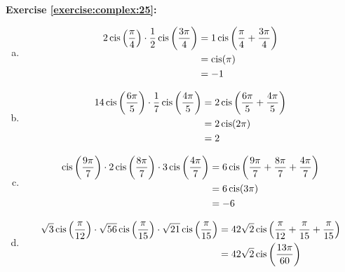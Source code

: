 \noindent\textbf{Exercise \ref{exercise:complex:25}:} %
\begin{enumerate}[(a)]
\item
\begin{align*}
2\operatorname{cis}\left(\frac{\pi}{4}\right) \cdot \frac{1}{2} \operatorname{cis}\left( \frac{3\pi}{4}\right) &= 1\operatorname{cis}\left(\frac{\pi}{4} + \frac{3\pi}{4}\right)\\
&= \operatorname{cis}(\pi)\\
&= -1
\end{align*}

\item 
\begin{align*}
14\operatorname{cis}\left( \frac{6\pi}{5}\right) \cdot \frac{1}{7} \operatorname{cis}\left( \frac{4\pi}{5} \right)  &= 2\operatorname{cis}\left(\frac{6\pi}{5} + \frac{4\pi}{5}\right)\\
&= 2\operatorname{cis}(2\pi)\\
&= 2
\end{align*}

\item
\begin{align*}
\operatorname{cis}\left(\frac{9\pi}{7}\right) \cdot 2 \operatorname{cis}\left( \frac{8\pi}{7}\right) \cdot 3 \operatorname{cis}\left( \frac{4\pi}{7}\right)  &= 6\operatorname{cis}\left(\frac{9\pi}{7} + \frac{8\pi}{7} + \frac{4\pi}{7}\right)\\
&= 6\operatorname{cis}(3\pi)\\
&= -6
\end{align*}

\item 
\begin{align*}
\sqrt{3}\operatorname{cis}\left(\frac{\pi}{12}\right)\cdot \sqrt{56}\operatorname{cis}\left(\frac{\pi}{15}\right)\cdot \sqrt{21}\operatorname{cis}\left(\frac{\pi}{15}\right) &= 42\sqrt{2}\operatorname{cis}\left(\frac{\pi}{12} + \frac{\pi}{15} + \frac{\pi}{15}\right)\\
&= 42\sqrt{2}\operatorname{cis}\left(\frac{13\pi}{60}\right)\\
\end{align*}


\end{enumerate}

